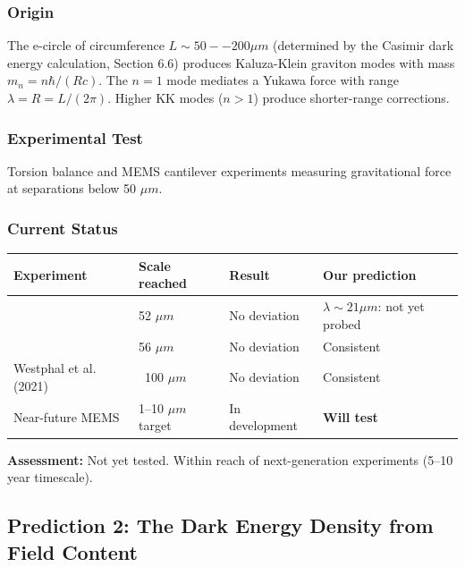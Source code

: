 \documentclass[aps,prd,preprint,superscriptaddress,longbibliography,floatfix]{revtex4-2}
\theoremstyle{remark}
\begin{document}
\subsubsection{Origin}

The e-circle of circumference $L \sim  50--200 \mu m$ (determined by the Casimir dark energy calculation, Section 6.6) produces Kaluza-Klein graviton modes with mass $m_n = n\hbar/(Rc)$. The $n = 1$ mode mediates a Yukawa force with range $\lambda = R = L/(2\pi)$. Higher KK modes ($n > 1$) produce shorter-range corrections.


\subsubsection{Experimental Test}

Torsion balance and MEMS cantilever experiments measuring gravitational force at separations below 50 $\mu m$.


\subsubsection{Current Status}


\begin{table}[H]
\begin{ruledtabular}
\begin{tabular}{p{3.8cm}p{3.8cm}p{3.8cm}p{3.8cm}}
Experiment & Scale reached & Result & Our prediction \\
\hline
\cite{Leeetal2020} & 52 $\mu m$ & No deviation & $\lambda \sim  21 \mu m$: not yet probed \\
\cite{Kapneretal2007} & 56 $\mu m$ & No deviation & Consistent \\
Westphal et al. (2021) & ~100 $\mu m$ & No deviation & Consistent \\
Near-future MEMS & 1--10 $\mu m$ target & In development & \textbf{Will test} \\
\end{tabular}
\end{ruledtabular}
\end{table}

\textbf{Assessment:} Not yet tested. Within reach of next-generation experiments (5--10 year timescale).



\subsection{Prediction 2: The Dark Energy Density from Field Content}
\end{document}
